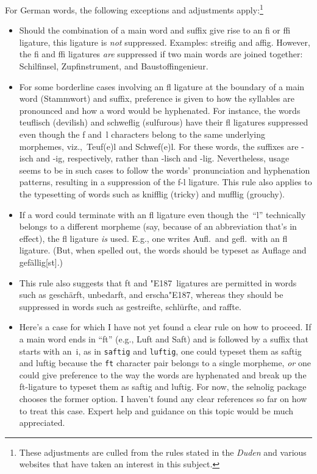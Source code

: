 \documentclass[12pt]{article}
\newcommand{\pkg}[1]{\textsf{#1}}
\newcommand{\opt}[1]{\texttt{#1}}
\begin{document}
For German words, the following exceptions and adjustments apply:\footnote{These adjustments are culled from the rules stated in the \emph{Duden} and  various websites that have taken an interest in this subject.}
\begin{itemize}
\item Should the combination of a main word and suffix give rise to an fi or ffi ligature, this ligature is \emph{not} suppressed. Examples: streifig and affig. However, the fi and ffi ligatures \emph{are} suppressed if two main words are joined together: Schilfinsel, Zupfinstrument, and Baustoffingenieur.

\item For some borderline cases involving an fl ligature at the boundary of a main word (Stammwort) and suffix, preference is given to how the syllables are pronounced and how a word would be hyphenated. For instance, the words teuflisch (devilish) and schweflig (sulfurous) have their fl ligatures suppressed even though the f and~l characters belong to the same underlying morphemes, {viz.},\ Teuf(e)l and Schwef(e)l. For these words, the suffixes are -isch and -ig, respectively, rather than -lisch and -lig. Nevertheless, usage seems to be in such cases to follow the words' pronunciation and hyphenation patterns, resulting in a suppression of the f-l ligature. This rule also applies to the typesetting of words such as knifflig (tricky) and mufflig (grouchy).

\item If a word could terminate with an fl ligature even though the~\enquote{l} technically belongs to a different morpheme (say, because of an abbreviation that's in effect), the fl ligature \emph{is} used. E.g., one writes Aufl.\ and gefl.\ with an fl ligature. (But, when spelled out, the words should be typeset as Auflage and gefällig[s\breaklig t].)

\item This rule also suggests that ft and \char"E187\ ligatures are permitted in words such as geschärft, unbedarft, and erscha\char"E187, whereas they should be suppressed in words such as gestreifte, schlürfte, and raffte.

\item Here's a case for which I have not yet found a clear rule on how to proceed. If a main word ends in \enquote{ft} (e.g., Luft and Saft) and is followed by a suffix that starts with an~i, as in \opt{saftig} and \opt{luftig}, one could typeset them as saftig and luftig because the \opt{ft} character pair belongs to a single morpheme, \emph{or} one could give preference to the way the words are hyphenated and break up the ft-ligature to typeset them as saf\breaklig tig and luf\breaklig tig. For now, the \pkg{selnolig} package chooses the former option. I haven't found any clear references so far on how to treat this case. Expert help and guidance on this topic would be much appreciated.

\end{itemize}
\end{document}
